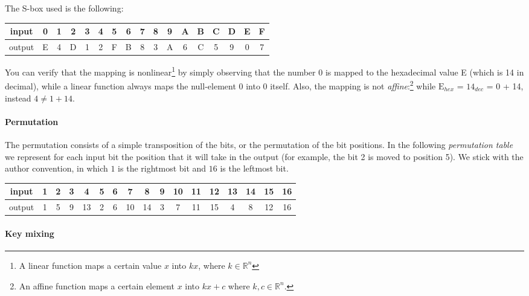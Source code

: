 \documentclass{article}
\begin{document}
  The S-box used is the following:
  \begin{center}
	\begin{tabular}{|c|c|c|c|c|c|c|c|c|c|c|c|c|c|c|c|c|}
	  \hline
	  input & 0 & 1 & 2 & 3 & 4 & 5 & 6 & 7 & 8 & 9 & A & B & C & D & E & F \\
	  \hline
	  output & E & 4 & D & 1 & 2 & F & B & 8 & 3 & A & 6 & C & 5 & 9 &
	  0 & 7 \\
	  \hline
	\end{tabular}
  \end{center}

  You can verify that the mapping is nonlinear\footnote{A linear
  function maps a certain value $x$ into $k x$, where
  $k \in \mathbb{R}^{n}$} by simply observing
  that the number 0 is mapped to the hexadecimal value E 
  (which is 14 in decimal), while a linear function always maps the
  null-element 0 into 0 itself.
  Also, the mapping is not \emph{affine}:\footnote{An affine function
  maps a certain element $x$ into $kx+c$ where $k, c \in
  \mathbb{R}^{n}$.} while $\textrm{E}_{hex}$ = $14_{dec}$ = 0 + 14,
  instead $4 \neq 1 + 14$.

  \paragraph{Permutation}
  
  The permutation consists of a simple transposition of the bits, or
  the permutation of the bit positions.
  In the following \emph{permutation table} we represent for each
  input bit the position that it will take in the output (for example,
  the bit 2 is moved to position 5). 
  We stick with the author convention, in which $1$ is the
  rightmost bit and $16$ is the leftmost bit.
  \begin{center}
	\begin{tabular}{|c|c|c|c|c|c|c|c|c|c|c|c|c|c|c|c|c|}
	  \hline
	  input & 1 & 2 & 3 & 4 & 5 & 6 & 7 & 8 & 9 & 10 & 11 & 12 & 13 & 14 & 15& 16 \\
	  \hline
	  output & 1 & 5 & 9 & 13 & 2 & 6 & 10 & 14 & 3 & 7 & 11 & 15 & 4 & 8 &
	  12 & 16 \\
	  \hline
	\end{tabular}
  \end{center}
  
  \paragraph{Key mixing}
\end{document}
